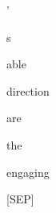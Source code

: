 \documentclass[varwidth=150mm]{standalone}
\begin{document}
\begin{CJK*}{UTF8}{gbsn}
{{{\colorbox{red!3.273906707763672}{\strut '} \colorbox{red!3.6575276851654053}{\strut s} \colorbox{red!2.4327337741851807}{\strut able} \colorbox{red!4.313488006591797}{\strut direction} \colorbox{red!6.539978981018066}{\strut are} \colorbox{red!12.767248153686523}{\strut the} \colorbox{red!19.891462326049805}{\strut engaging} \colorbox{red!1.7664470672607422}{\strut [SEP]}
}}}
\end{CJK*}
\end{document}
